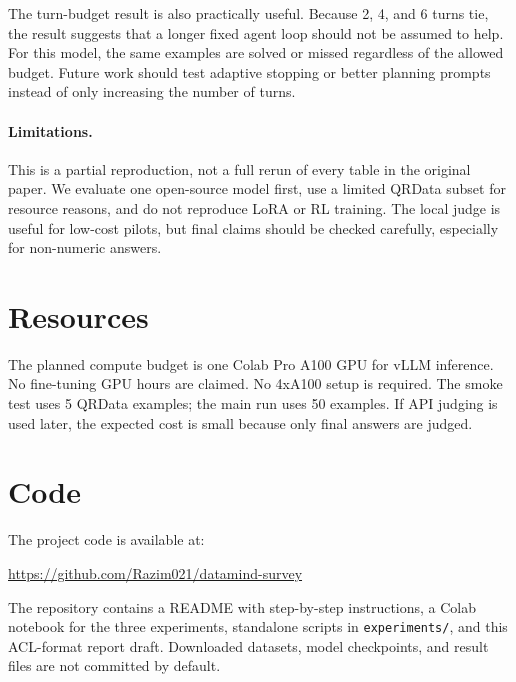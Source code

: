 \documentclass[11pt]{article}
\begin{document}
The turn-budget result is also practically useful.
Because 2, 4, and 6 turns tie, the result suggests that a longer fixed agent loop should not be assumed to help.
For this model, the same examples are solved or missed regardless of the allowed budget.
Future work should test adaptive stopping or better planning prompts instead of only increasing the number of turns.

\paragraph{Limitations.}
This is a partial reproduction, not a full rerun of every table in the original paper.
We evaluate one open-source model first, use a limited QRData subset for resource reasons, and do not reproduce LoRA or RL training.
The local judge is useful for low-cost pilots, but final claims should be checked carefully, especially for non-numeric answers.

\section{Resources}

The planned compute budget is one Colab Pro A100 GPU for vLLM inference.
No fine-tuning GPU hours are claimed.
No 4xA100 setup is required.
The smoke test uses 5 QRData examples; the main run uses 50 examples.
If API judging is used later, the expected cost is small because only final answers are judged.

\section{Code}

The project code is available at:

\begin{center}
\url{https://github.com/Razim021/datamind-survey}
\end{center}

The repository contains a README with step-by-step instructions, a Colab notebook for the three experiments, standalone scripts in \texttt{experiments/}, and this ACL-format report draft.
Downloaded datasets, model checkpoints, and result files are not committed by default.



\end{document}
